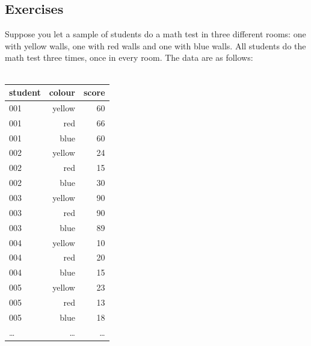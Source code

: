 \documentclass[]{report}\usepackage[]{graphicx}\usepackage[]{color}
\begin{document}
\subsection{Exercises}

Suppose you let a sample of students do a math test in three different rooms: one with yellow walls, one with red walls and one with blue walls. All students do the math test three times, once in every room. The data are as follows:
\\
 \\
 \begin{tabular}{lrr}
 student & colour & score \\ \hline
 001 & yellow & 60 \\
 001 & red & 66 \\
 001 & blue & 60 \\
 002 & yellow & 24 \\
 002 & red & 15 \\
 002 & blue & 30 \\
 003 & yellow & 90 \\
 003 & red & 90 \\
 003 & blue & 89 \\
 004 & yellow & 10 \\
 004 & red & 20 \\
 004 & blue & 15 \\
 005 & yellow & 23 \\
 005 & red & 13 \\
 005 & blue & 18 \\
 \dots & \dots & \dots \\
 \end{tabular}
\\
\\
\end{document}

